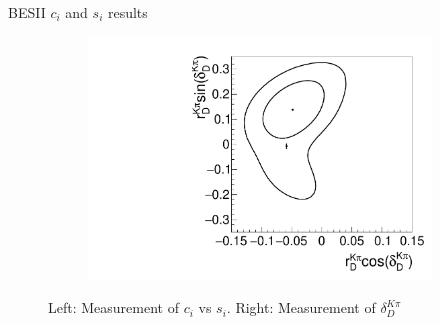 \documentclass{beamer}
\begin{document}
\begin{frame}{BESII $c_i$ and $s_i$ results}
\begin{figure}
\begin{subfigure}{0.30\textwidth}
      \includegraphics[width = 1.0\textwidth]{Plots/Contour_DeltaKpi.pdf}
    \end{subfigure}
    \caption{Left: Measurement of $c_i$ vs $s_i$. Right: Measurement of $\delta_D^{K\pi}$}
  \end{figure}
\end{frame}
\end{document}
